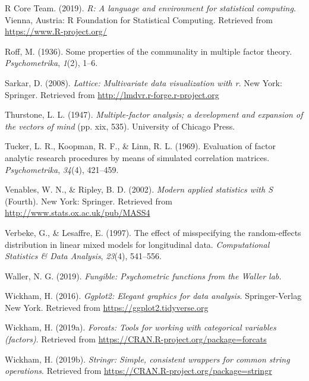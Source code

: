 \documentclass[
  english,
  man]{apa6}
\begin{document}
\leavevmode\hypertarget{ref-R-base}{}%
R Core Team. (2019). \emph{R: A language and environment for statistical computing}. Vienna, Austria: R Foundation for Statistical Computing. Retrieved from \url{https://www.R-project.org/}

\leavevmode\hypertarget{ref-roff1936some}{}%
Roff, M. (1936). Some properties of the communality in multiple factor theory. \emph{Psychometrika}, \emph{1}(2), 1--6.

\leavevmode\hypertarget{ref-R-lattice}{}%
Sarkar, D. (2008). \emph{Lattice: Multivariate data visualization with r}. New York: Springer. Retrieved from \url{http://lmdvr.r-forge.r-project.org}

\leavevmode\hypertarget{ref-thurstone1947multiple}{}%
Thurstone, L. L. (1947). \emph{Multiple-factor analysis; a development and expansion of the vectors of mind} (pp. xix, 535). University of Chicago Press.

\leavevmode\hypertarget{ref-tucker1969}{}%
Tucker, L. R., Koopman, R. F., \& Linn, R. L. (1969). Evaluation of factor analytic research procedures by means of simulated correlation matrices. \emph{Psychometrika}, \emph{34}(4), 421--459.

\leavevmode\hypertarget{ref-R-MASS}{}%
Venables, W. N., \& Ripley, B. D. (2002). \emph{Modern applied statistics with S} (Fourth). New York: Springer. Retrieved from \url{http://www.stats.ox.ac.uk/pub/MASS4}

\leavevmode\hypertarget{ref-verbeke1997}{}%
Verbeke, G., \& Lesaffre, E. (1997). The effect of misspecifying the random-effects distribution in linear mixed models for longitudinal data. \emph{Computational Statistics \& Data Analysis}, \emph{23}(4), 541--556.

\leavevmode\hypertarget{ref-R-fungible}{}%
Waller, N. G. (2019). \emph{Fungible: Psychometric functions from the Waller lab.}

\leavevmode\hypertarget{ref-R-ggplot2}{}%
Wickham, H. (2016). \emph{Ggplot2: Elegant graphics for data analysis}. Springer-Verlag New York. Retrieved from \url{https://ggplot2.tidyverse.org}

\leavevmode\hypertarget{ref-R-forcats}{}%
Wickham, H. (2019a). \emph{Forcats: Tools for working with categorical variables (factors)}. Retrieved from \url{https://CRAN.R-project.org/package=forcats}

\leavevmode\hypertarget{ref-R-stringr}{}%
Wickham, H. (2019b). \emph{Stringr: Simple, consistent wrappers for common string operations}. Retrieved from \url{https://CRAN.R-project.org/package=stringr}
\end{document}
